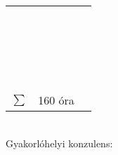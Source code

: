 \documentclass[10pt,a4paper,oneside]{report}
\newcounter{magicrownumbers}
\newcommand\rownum{\stepcounter{magicrownumbers}\arabic{magicrownumbers}}
\begin{document}
\begin{table}[h!]
\begin{tabular}{| c | p{3 cm} | p{10 cm} |}
	\rownum &  &  \\ \hline
	\rownum &  &  \\ \hline
	\rownum &  &  \\ \hline
	\rownum &  &  \\ \hline
	\rownum &  &  \\ \hline
	\rownum &  &  \\ \hline
	\rownum &  &  \\ \hline
	\rownum &  &  \\ \hline
	\rownum &  &  \\ \hline
	\rownum &  &  \\ \hline
	\rownum &  &  \\ \hline
	\rownum &  &  \\ \hline
	\rownum &  &  \\ \hline
	\rownum &  &  \\ \hline
	\rownum &  &  \\ \hline
	\rownum &  &  \\ \hline
	\rownum &  &  \\ \hline
	\rownum &  &  \\ \hline
	\rownum &  &  \\ \hline
	\rownum &  &  \\ \hline
	\rownum &  &  \\ \hline
	$\sum$ & 160 óra& \\ \hline
	\end{tabular}
\end{table}
\vspace{.5 cm} \\
Gyakorlóhelyi konzulens:
\end{document}
